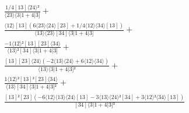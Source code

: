 \documentclass[varwidth, border=5pt]{standalone}
\begin{document}
\begin{my}
$\begin{gathered}
\scriptscriptstyle\frac{1/4[13]⟨24⟩²}{⟨23⟩⟨3|1+4|3]} +\\
\scriptscriptstyle\frac{⟨12⟩[13](6⟨23⟩⟨24⟩[23]+1/4⟨12⟩⟨34⟩[13])}{⟨13⟩⟨23⟩[34]⟨3|1+4|3]} +\\
\scriptscriptstyle\frac{-1⟨12⟩²[13][23]⟨34⟩}{⟨13⟩²[34]⟨3|1+4|3]} +\\
\scriptscriptstyle\frac{[13][23]⟨24⟩(-2⟨13⟩⟨24⟩+6⟨12⟩⟨34⟩)}{⟨13⟩⟨3|1+4|3]²} +\\
\scriptscriptstyle\frac{1⟨12⟩²[13]²[23]⟨34⟩}{⟨13⟩[34]⟨3|1+4|3]²} +\\
\scriptscriptstyle\frac{[13]²[23](-6⟨12⟩⟨13⟩⟨24⟩[13]-3⟨13⟩⟨24⟩²[34]+3⟨12⟩²⟨34⟩[13])}{[34]⟨3|1+4|3]³} \phantom{+}
\end{gathered}$
\end{my}
\end{document}
